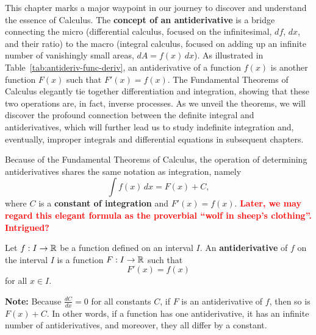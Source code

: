 This chapter marks a major waypoint in our journey to discover and understand the essence of Calculus. The \textbf{concept of an antiderivative} is a bridge connecting the micro (differential calculus, focused on the infinitesimal, $df$, $dx$, and their ratio) to the macro (integral calculus, focused on adding up an infinite number of vanishingly small areas, $dA = f(x) \, dx$).  As illustrated in Table~\ref{tab:antideriv-func-deriv}, an antiderivative of a function \( f(x) \) is another function \( F(x) \) such that \( F'(x) = f(x) \). The Fundamental Theorems of Calculus elegantly tie together differentiation and integration, showing that these two operations are, in fact, inverse processes. As we unveil the theorems, we will discover the profound connection between the definite integral and antiderivatives, which will further lead us to study indefinite integration and, eventually, improper integrals and differential equations in subsequent chapters.


Because of the Fundamental Theorems of Calculus, the operation of determining antiderivatives shares the same notation as integration, namely
\[ \int f(x) \, dx = F(x) + C, \]
where \( C \) is a \textbf{constant of integration} and $F'(x) = f(x)$. \textcolor{red}{\bf Later, we may regard this elegant formula as the proverbial ``wolf in sheep's clothing''. Intrigued?} 

\bigskip

\begin{tcolorbox}[colback=mylightblue, title = {\bf Antiderivative of a Function}, breakable]

\begin{definition} 
\label{def:antiDerivative}

Let \( f:I \to \mathbb R \) be a function defined on an interval \( I \). An \textbf{antiderivative} of \( f \) on the interval \( I \) is a function \( F: I \to \mathbb R \) such that
\[
F'(x) = f(x)
\]
for all \( x  \in I \).

\end{definition}

\textbf{Note:} Because $\frac{dC}{dx}=0 $ for all constants $C$, if $F$ is an antiderivative of $f$, then so is $F(x) + C$. In other words, if a function has one antiderivative, it has an infinite number of antiderivatives, and moreover, they all differ by a constant.
\end{tcolorbox}

\bigskip

